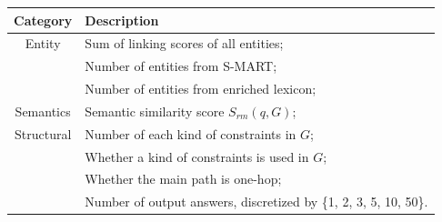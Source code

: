 \begin{table}[ht]
    \centering
    \begin{tabular}{|c|l|}
        \hline
        \textbf{Category}    & \textbf{Description}   \\
        \hline
        Entity  & Sum of linking scores of all entities; \\
                & Number of entities from S-MART; \\
                & Number of entities from enriched lexicon; \\
        \hline
        Semantics & Semantic similarity score $S_{rm}(q, G)$; \\
        \hline
        Structural  &  Number of each kind of constraints in $G$; \\
                    &  Whether a kind of constraints is used in $G$; \\
                    &  Whether the main path is one-hop; \\
                    &  Number of output answers, discretized by \{1, 2, 3, 5, 10, 50\}. \\
        \hline
    \end{tabular}
    \label{tab:compqa-feature}
\end{table}

